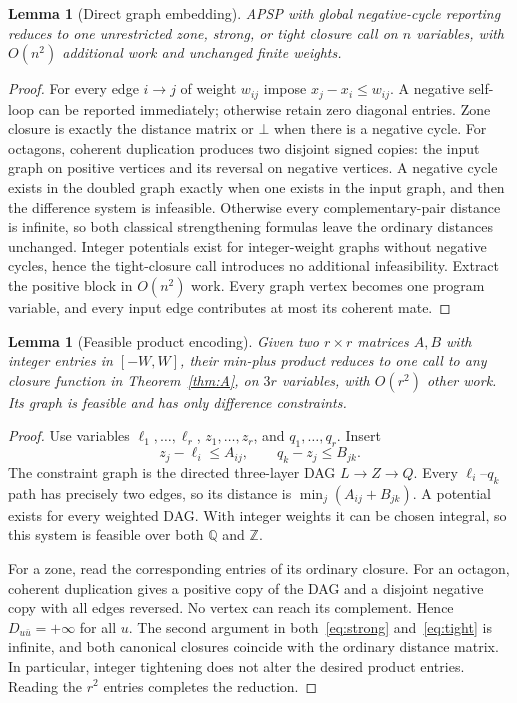 \documentclass[manuscript,11pt,screen,nonacm]{acmart}
\newtheorem{lemma}[theorem]{Lemma}
\theoremstyle{definition}
\newcommand{\Q}{\mathbb Q}
\newcommand{\Z}{\mathbb Z}
\begin{document}
\begin{lemma}[Direct graph embedding]\label{lem:direct}
APSP with global negative-cycle reporting reduces to one unrestricted zone, strong, or tight closure call on $n$ variables, with $O(n^2)$ additional work and unchanged finite weights.
\end{lemma}
\begin{proof}
For every edge $i\to j$ of weight $w_{ij}$ impose $x_j-x_i\leq w_{ij}$. A negative self-loop can be reported immediately; otherwise retain zero diagonal entries. Zone closure is exactly the distance matrix or $\bot$ when there is a negative cycle. For octagons, coherent duplication produces two disjoint signed copies: the input graph on positive vertices and its reversal on negative vertices. A negative cycle exists in the doubled graph exactly when one exists in the input graph, and then the difference system is infeasible. Otherwise every complementary-pair distance is infinite, so both classical strengthening formulas leave the ordinary distances unchanged. Integer potentials exist for integer-weight graphs without negative cycles, hence the tight-closure call introduces no additional infeasibility. Extract the positive block in $O(n^2)$ work. Every graph vertex becomes one program variable, and every input edge contributes at most its coherent mate.
\end{proof}

\begin{lemma}[Feasible product encoding]\label{lem:product}
Given two $r\times r$ matrices $A,B$ with integer entries in $[-W,W]$, their min-plus product reduces to one call to any closure function in Theorem~\ref{thm:A}, on $3r$ variables, with $O(r^2)$ other work. Its graph is feasible and has only difference constraints.
\end{lemma}
\begin{proof}
Use variables $\ell_1,\ldots,\ell_r$, $z_1,\ldots,z_r$, and $q_1,\ldots,q_r$. Insert
\[
 z_j-\ell_i\leq A_{ij},\qquad q_k-z_j\leq B_{jk}.
\]
The constraint graph is the directed three-layer DAG $L\to Z\to Q$. Every $\ell_i$--$q_k$ path has precisely two edges, so its distance is $\min_j(A_{ij}+B_{jk})$. A potential exists for every weighted DAG. With integer weights it can be chosen integral, so this system is feasible over both $\Q$ and $\Z$.

For a zone, read the corresponding entries of its ordinary closure. For an octagon, coherent duplication gives a positive copy of the DAG and a disjoint negative copy with all edges reversed. No vertex can reach its complement. Hence $D_{u\bar u}=+\infty$ for all $u$. The second argument in both~\eqref{eq:strong} and~\eqref{eq:tight} is infinite, and both canonical closures coincide with the ordinary distance matrix. In particular, integer tightening does not alter the desired product entries. Reading the $r^2$ entries completes the reduction.
\end{proof}
\end{document}

